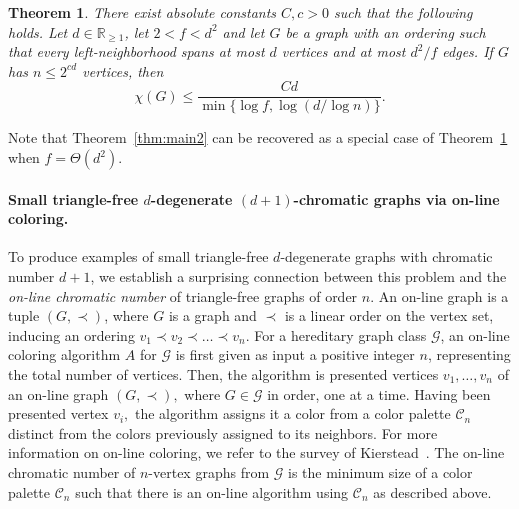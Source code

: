\documentclass[10pt]{amsart}
\newtheorem{theorem}{Theorem}[section]
\theoremstyle{definition}
\newcommand{\cC}{\mathcal{C}}
\newcommand{\calG}{\mathcal{G}}
\begin{document}
\begin{theorem}\label{thm:sparse}
      There exist absolute constants $C, c > 0$ such that the following holds. Let $d\in \mathbb{R}_{\ge 1}$, let $2<f<d^2$ and let $G$ be a graph with an ordering such that every left-neighborhood spans at most $d$ vertices and at most $d^2/f$ edges. If $G$ has $n \le 2^{cd}$ vertices, then \[ \chi(G) \le \frac{C d}{\min\{\log  f,\log(d/\log n)\}}. \]  
\end{theorem}

Note that Theorem~\ref{thm:main2} can be recovered as a special case of Theorem~\ref{thm:sparse} when $f=\Theta(d^2)$. 

\paragraph*{\textbf{Small triangle-free $d$-degenerate $(d+1)$-chromatic graphs via on-line coloring.}} To produce examples of small triangle-free $d$-degenerate graphs with chromatic number $d+1$, we establish a surprising connection between this problem and the \emph{on-line chromatic number} of triangle-free graphs of order $n$. An on-line graph is a tuple $(G, \prec)$, where $G$ is a graph and $\prec$ is a linear order on the vertex set, inducing an ordering $v_1 \prec v_2 \prec \dots \prec v_n$. For a hereditary graph class $\calG$, an on-line coloring algorithm $A$ for $\calG$ is first given as input a positive integer $n$, representing the total number of vertices. Then, the algorithm is presented vertices $v_1, \dots, v_n$ of an on-line graph $(G, \prec),$ where $G \in \calG$ in order, one at a time. Having been presented vertex $v_i,$ the algorithm assigns it a color from a color palette $\cC_n$ distinct from the colors previously assigned to its neighbors. 
For more information on on-line coloring, we refer to the survey of Kierstead~\cite{kierstead}. The on-line chromatic number of $n$-vertex graphs from $\calG$ is the minimum size of a color palette $\cC_n$ such that there is an on-line algorithm using $\cC_n$ as described above.
\end{document}
